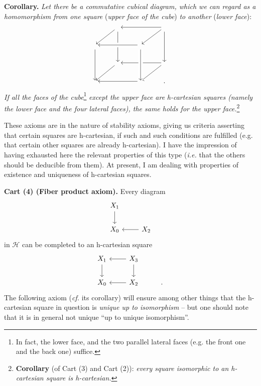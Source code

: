 \noindent\textbf{Corollary.} \textit{Let there be a commutative cubical diagram, which we can regard as a homomorphism from one square} (\textit{upper face of the cube}) \textit{to another} (\textit{lower face}):
\[
\begin{tikzcd}
 & {} \arrow[dl] \arrow[dd] & & {} \arrow[ll] \arrow[dl] \arrow[dd] \\
{} \arrow[dd] & & {} \arrow[ll, crossing over] & \\
 & {} \arrow[dl] & & {} \arrow[ll] \arrow[dl] \\
{} & & {} \arrow[ll] \arrow[from=uu, crossing over] & .
\end{tikzcd}
\]
\textit{If all the faces of the cube}\footnote{In fact, the lower face, and the two parallel lateral faces (e.g. the front one and the back one) suffice.} \textit{except the upper face are}  \textit{h-cartesian squares (namely the lower face and the four lateral faces), the same holds for the upper face.}\footnote{\textbf{Corollary} (of Cart (3) and Cart (2)): \textit{every square isomorphic to an h-cartesian square is h-cartesian.}}

\noindent These axioms are in the nature of stability axioms, giving us criteria asserting that certain squares are h-cartesian, if such and such conditions are fulfilled (e.g. that certain other squares are already h-cartesian). I have the impression of having exhausted here the relevant properties of this type (\textit{i.e.} that the others should be deducible from them). At present, I am dealing with properties of existence and uniqueness of h-cartesian squares. %

\noindent\textbf{Cart (4) (Fiber product axiom).} Every diagram
\[
\begin{tikzcd}
X_1 \arrow[d] & \\
X_0 & X_2 \arrow[l]
\end{tikzcd}
\]
in $\mathcal{H}$ can be completed to an h-cartesian square
\[
\begin{tikzcd}
X_1 \arrow[d] & X_3 \arrow[l] \arrow[d] & \\
X_0 & X_2 \arrow[l] & .
\end{tikzcd}
\]
The following axiom (\textit{cf.} its corollary) will ensure among other things that the h-cartesian square in question is \textit{unique up to isomorphism} – but one should note that it is in general not unique ``up to unique isomorphism''.